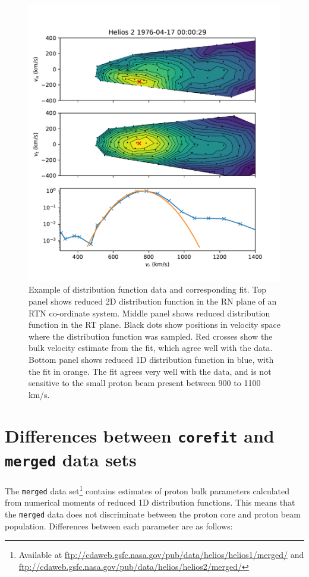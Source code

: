 \documentclass[11pt,a4paper]{article}
\begin{document}
\begin{figure}
	\centering
	\includegraphics[width=\textwidth]{I3_3D_example}
	\caption{Example of distribution function data and corresponding fit. Top panel shows reduced 2D distribution function in the RN plane of an RTN co-ordinate system. Middle panel shows reduced distribution function in the RT plane. Black dots show positions in velocity space where the distribution function was sampled. Red crosses show the bulk velocity estimate from the fit, which agree well with the data. Bottom panel shows reduced 1D distribution function in blue, with the fit in orange. The fit agrees very well with the data, and is not sensitive to the small proton beam present between 900 to 1100 km/s.}
	\label{fig:distribution fit}
\end{figure}

\section{Differences between \texttt{corefit} and \texttt{merged} data sets}
The \texttt{merged} data set\footnote{Available at \url{ftp://cdaweb.gsfc.nasa.gov/pub/data/helios/helios1/merged/} and \url{ftp://cdaweb.gsfc.nasa.gov/pub/data/helios/helios2/merged/}} contains estimates of proton bulk parameters calculated from numerical moments of reduced 1D distribution functions. This means that the \texttt{merged} data does not discriminate between the proton core and proton beam population. Differences between each parameter are as follows:
\end{document}

